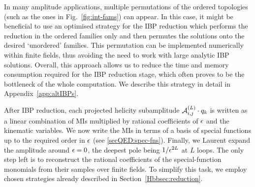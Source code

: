 \documentclass[main.tex]{subfiles}
\begin{document}
In many amplitude applications, multiple permutations of the ordered topologies (such as the ones in Fig.~\ref{fig:int-fams}) can appear. In this case, it might be beneficial to use an optimised strategy for the IBP reduction which performs the reduction in the ordered families only and then permutes the solutions onto the desired `unordered' families. This permutation can be implemented numerically within finite fields, thus avoiding the need to work with large analytic IBP solutions. Overall, this approach allows us to reduce the time and memory consumption required for the IBP reduction stage, which often proves to be the bottleneck of the whole computation. We describe this strategy in detail in Appendix~\ref{app:altIBPs}.

After IBP reduction, each projected helicity subamplitude $\mathcal{A}^{(L)}_{i,j}\cdot q_k$
is written as a linear combination of MIs multiplied by rational
coefficients of $\epsilon$ and the kinematic variables. We now write the MIs
in terms of a basis of special functions up to the required order in $\epsilon$
(see \cref{secQED:spec-fns}). Finally, we Laurent expand the amplitude around
$\epsilon=0$, the deepest pole being $1/\epsilon^{2 L}$ at $L$ loops. The only step
left is to reconstruct the rational coefficients of the special-function
monomials from their samples over finite fields. To simplify this task, we employ chosen strategies already described in Section~\ref{Hbbsec:reduction}.
\end{document}
